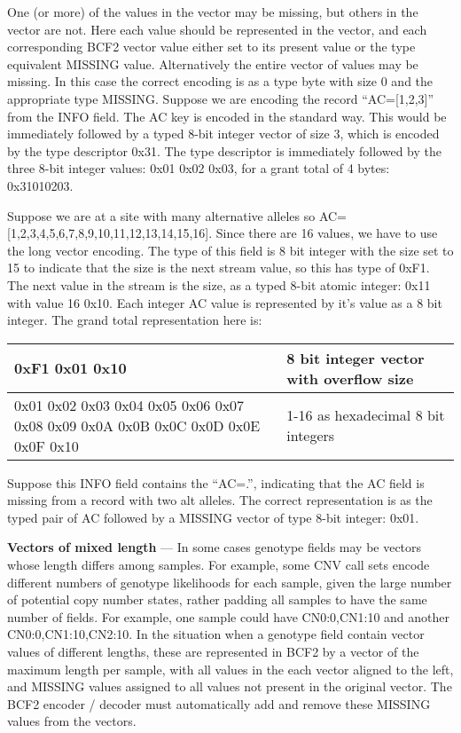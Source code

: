 \documentclass[8pt]{article}
\begin{document}
One (or more) of the values in the vector may be missing, but others in the vector are not.  Here each value should be represented in the vector, and each corresponding BCF2 vector value either set to its present value or the type equivalent MISSING value.
Alternatively the entire vector of values may be missing.  In this case the correct encoding is as a type byte with size 0 and the appropriate type MISSING.
Suppose we are encoding the record ``AC=[1,2,3]'' from the INFO field.  The AC key is encoded in the standard way.  This would be immediately followed by a typed 8-bit integer vector of size 3, which is encoded by the type descriptor 0x31.  The type descriptor is immediately followed by the three 8-bit integer values: 0x01 0x02 0x03, for a grant total of 4 bytes: 0x31010203.

Suppose we are at a site with many alternative alleles so AC=[1,2,3,4,5,6,7,8,9,10,11,12,13,14,15,16].  Since there are 16 values, we have to use the long vector encoding.  The type of this field is 8 bit integer with the size set to 15 to indicate that the size is the next stream value, so this has type of 0xF1.  The next value in the stream is the size, as a typed 8-bit atomic integer: 0x11 with value 16 0x10.  Each integer AC value is represented by it's value as a 8 bit integer.  The grand total representation here is:

\vspace{0.3cm}
\begin{tabular}{|p{9cm} | p{6cm}|} \hline
0xF1 0x01 0x10 & 8 bit integer vector with overflow size \\ \hline
0x01 0x02 0x03 0x04 0x05 0x06 0x07 0x08 0x09 0x0A 0x0B 0x0C 0x0D 0x0E 0x0F 0x10 & 1-16 as hexadecimal 8 bit integers \\ \hline
\end{tabular}
\vspace{0.3cm}

Suppose this INFO field contains the ``AC=.'', indicating that the AC field is missing from a record with two alt alleles.  The correct representation is as the typed pair of AC followed by a MISSING vector of type 8-bit integer: 0x01.

\vspace{0.3cm}
\textbf{Vectors of mixed length} --- In some cases genotype fields may be vectors whose length differs among samples.  For example, some CNV call sets encode different numbers of genotype likelihoods for each sample, given the large number of potential copy number states, rather padding all samples to have the same number of fields.  For example, one sample could have CN0:0,CN1:10 and another CN0:0,CN1:10,CN2:10.  In the situation when a genotype field contain vector values of different lengths, these are represented in BCF2 by a vector of the maximum length per sample, with all values in the each vector aligned to the left, and MISSING values assigned to all values not present in the original vector.  The BCF2 encoder / decoder must automatically add and remove these MISSING values from the vectors.
\end{document}
